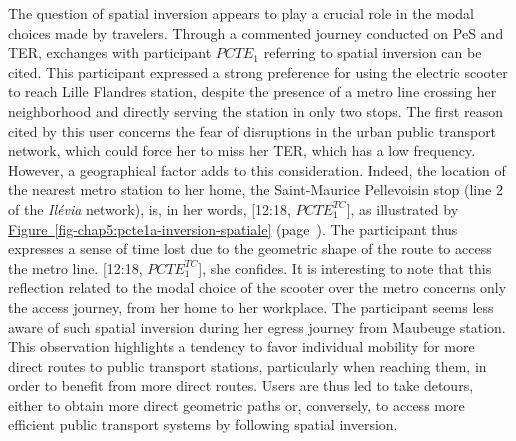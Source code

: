 \begin{refsegment}
The question of spatial inversion appears to play a crucial role in the modal choices made by travelers. Through a commented journey conducted on \acrshort{PeS} and \acrshort{TER}, exchanges with participant \(PCTE_{1}\) referring to spatial inversion can be cited. This participant expressed a strong preference for using the electric scooter to reach Lille Flandres station, despite the presence of a metro line crossing her neighborhood and directly serving the station in only two stops. The first reason cited by this user concerns the fear of disruptions in the urban public transport network, which could force her to miss her \acrshort{TER}, which has a low frequency. However, a geographical factor adds to this consideration. Indeed, the location of the nearest metro station to her home, the Saint-Maurice Pellevoisin stop (line 2 of the \textsl{Ilévia} network), is, in her words,  [12:18, \(PCTE^{TC}_{1}\)], as illustrated by \hyperref[fig-chap5:pcte1a-inversion-spatiale]{Figure~\ref{fig-chap5:pcte1a-inversion-spatiale}} (page~\pageref{fig-chap5:pcte1a-inversion-spatiale}). The participant thus expresses a sense of time lost due to the geometric shape of the route to access the metro line.  [12:18, \(PCTE^{TC}_{1}\)], she confides. It is interesting to note that this reflection related to the modal choice of the scooter over the metro concerns only the access journey, from her home to her workplace. The participant seems less aware of such spatial inversion during her egress journey from Maubeuge station. This observation highlights a tendency to favor individual mobility for more direct routes to public transport stations, particularly when reaching them, in order to benefit from more direct routes. Users are thus led to take detours, either to obtain more direct geometric paths or, conversely, to access more efficient public transport systems by following spatial inversion.%


\end{refsegment}
